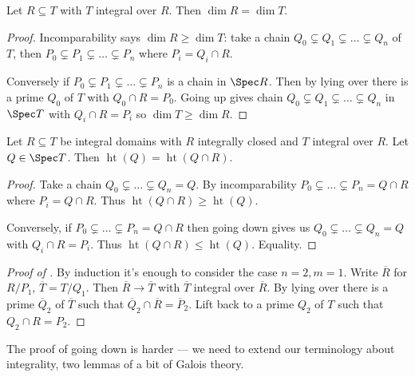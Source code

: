 \documentclass[a4paper]{article}
\DeclareMathOperator{\htt}{ht} %
\begin{document}
\begin{corollary}
  \label{cor:dimension of integral extension}
  Let \(R \subseteq T\) with \(T\) integral over \(R\). Then \(\dim R = \dim T\).
\end{corollary}

\begin{proof}
  Incomparability says \(\dim R \geq \dim T\): take a chain \(Q_0 \subsetneq Q_1 \subsetneq \dots \subsetneq Q_n\) of \(T\), then \(P_0 \subsetneq P_1 \subsetneq \dots \subsetneq P_n\) where \(P_i = Q_i \cap R\).

  Conversely if \(P_0 \subsetneq P_1 \subsetneq \dots \subsetneq P_n\) is a chain in \(\Spec R\). Then by lying over there is a prime \(Q_0\) of \(T\) with \(Q_0 \cap R = P_0\). Going up gives chain \(Q_0 \subsetneq Q_1 \subsetneq \dots \subsetneq Q_n\) in \(\Spec T\) with \(Q_i \cap R = P_i\) so \(\dim T \geq \dim R\).
\end{proof}

\begin{corollary}
  Let \(R \subseteq T\) be integral domains with \(R\) integrally closed and \(T\) integral over \(R\). Let \(Q \in \Spec T\). Then \(\htt(Q) = \htt(Q \cap R)\).
\end{corollary}

\begin{proof}
  Take a chain \(Q_0 \subsetneq \dots \subsetneq Q_n = Q\). By incomparability \(P_0 \subsetneq \dots \subsetneq P_n = Q \cap R\) where \(P_i = Q \cap R\). Thus \(\htt(Q \cap R) \geq \htt (Q)\).

  Conversely, if \(P_0 \subsetneq \dots \subsetneq P_n = Q \cap R\) then going down gives us \(Q_0 \subsetneq \dots \subsetneq Q_n = Q\) with \(Q_i \cap R = P_i\). Thus \(\htt(Q \cap R) \leq \htt(Q)\). Equality.
\end{proof}

\begin{proof}[Proof of ]
  By induction it's enough to consider the case \(n = 2, m = 1\). Write \(\overline R\) for \(R/P_1\), \(\overline T = T/Q_1\). Then \(\overline R \to \overline T\) with \(\overline T\) integral over \(\overline R\). By lying over there is a prime \(\overline Q_2\) of \(\overline T\) such that \(\overline Q_2 \cap \overline R = \overline P_2\). Lift back to a prime \(Q_2\) of \(T\) such that \(Q_2 \cap R = P_2\).
\end{proof}

The proof of going down is harder --- we need to extend our terminology about integrality, two lemmas of a bit of Galois theory.
\end{document}
